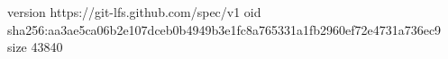 version https://git-lfs.github.com/spec/v1
oid sha256:aa3ae5ca06b2e107dceb0b4949b3e1fc8a765331a1fb2960ef72e4731a736ec9
size 43840
